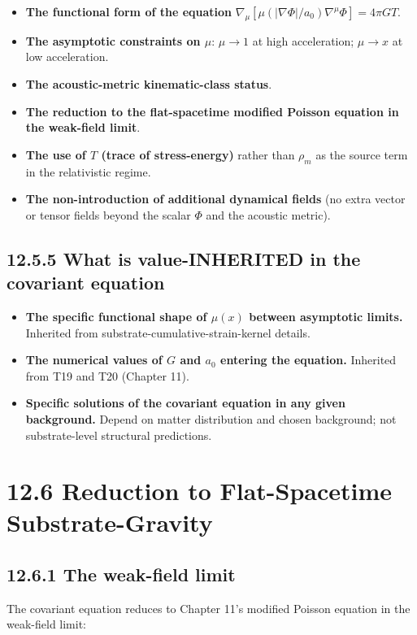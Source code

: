 \documentclass[11pt]{book}
\begin{document}
\begin{itemize}
\item \textbf{The functional form of the equation} $\nabla_\mu[\mu(|\nabla\Phi|/a_0)\nabla^\mu\Phi] = 4\pi G T$.
\item \textbf{The asymptotic constraints on $\mu$}: $\mu \to 1$ at high acceleration; $\mu \to x$ at low acceleration.
\item \textbf{The acoustic-metric kinematic-class status}.
\item \textbf{The reduction to the flat-spacetime modified Poisson equation in the weak-field limit}.
\item \textbf{The use of $T$ (trace of stress-energy)} rather than $\rho_m$ as the source term in the relativistic regime.
\item \textbf{The non-introduction of additional dynamical fields} (no extra vector or tensor fields beyond the scalar $\Phi$ and the acoustic metric).
\end{itemize}

\subsection{12.5.5 What is value-INHERITED in the covariant equation}

\begin{itemize}
\item \textbf{The specific functional shape of $\mu(x)$ between asymptotic limits.} Inherited from substrate-cumulative-strain-kernel details.
\item \textbf{The numerical values of $G$ and $a_0$ entering the equation.} Inherited from T19 and T20 (Chapter 11).
\item \textbf{Specific solutions of the covariant equation in any given background.} Depend on matter distribution and chosen background; not substrate-level structural predictions.
\end{itemize}

\section{12.6 Reduction to Flat-Spacetime Substrate-Gravity}

\subsection{12.6.1 The weak-field limit}

The covariant equation reduces to Chapter 11's modified Poisson equation in the weak-field limit:
\end{document}
